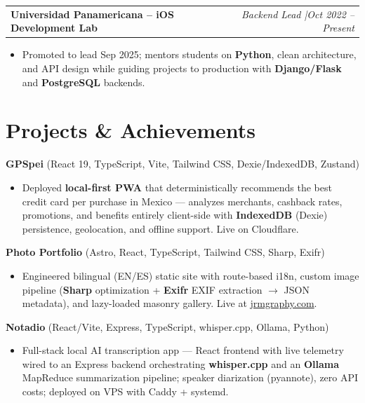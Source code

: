 \documentclass[10pt, letterpaper]{article}
\makeatletter
\newcommand{\entry}[2]{%
  \noindent\begin{tabular*}{\textwidth}{@{}l@{\extracolsep{\fill}}r@{}}
    #1 & #2
  \end{tabular*}}
\newenvironment{cvlist}{%
  \begin{itemize}[leftmargin=1.2em,itemsep=0.5pt,topsep=2pt,parsep=0pt]
}{\end{itemize}}
\makeatother
\begin{document}
\medskip

\entry{\textbf{Universidad Panamericana -- iOS Development Lab}}{%
  \textit{Backend Lead \enspace|\enspace Oct 2022 -- Present}}

\begin{cvlist}
  \item Promoted to lead Sep 2025; mentors students on \textbf{Python}, clean
        architecture, and API design while guiding projects to production with
        \textbf{Django/Flask} and \textbf{PostgreSQL} backends.
\end{cvlist}

\section{Projects \& Achievements}

\noindent\textbf{GPSpei} (React 19, TypeScript, Vite, Tailwind CSS, Dexie/IndexedDB, Zustand)

\begin{cvlist}
  \item Deployed \textbf{local-first PWA} that deterministically recommends the best
        credit card per purchase in Mexico --- analyzes merchants, cashback rates,
        promotions, and benefits entirely client-side with \textbf{IndexedDB} (Dexie)
        persistence, geolocation, and offline support. Live on Cloudflare.
\end{cvlist}

\smallskip

\noindent\textbf{Photo Portfolio} (Astro, React, TypeScript, Tailwind CSS, Sharp, Exifr)

\begin{cvlist}
  \item Engineered bilingual (EN/ES) static site with route-based i18n, custom image
        pipeline (\textbf{Sharp} optimization + \textbf{Exifr} EXIF extraction
        $\to$ JSON metadata), and lazy-loaded masonry gallery. Live at
        \href{https://jrmgraphy.com}{jrmgraphy.com}.
\end{cvlist}

\smallskip

\noindent\textbf{Notadio} (React/Vite, Express, TypeScript, whisper.cpp, Ollama, Python)

\begin{cvlist}
  \item Full-stack local AI transcription app --- React frontend with live telemetry
        wired to an Express backend orchestrating \textbf{whisper.cpp} and an
        \textbf{Ollama} MapReduce summarization pipeline; speaker diarization
        (pyannote), zero API costs; deployed on VPS with Caddy + systemd.
\end{cvlist}
\end{document}
